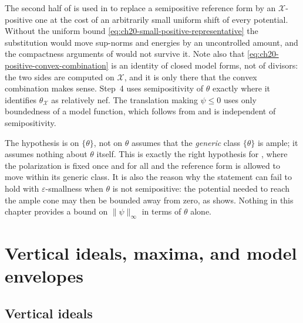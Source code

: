 \begin{remark}
\label{rem:ch20-smallness}
The second half of  is used in
 to replace a semipositive reference
form by an $\mathcal X$-positive one at the cost of an arbitrarily small
uniform shift of every potential.  Without the uniform bound
\eqref{eq:ch20-small-positive-representative} the substitution would move
sup-norms and energies by an uncontrolled amount, and the compactness
arguments of  would not survive it.  Note also
that \eqref{eq:ch20-positive-convex-combination} is an identity of closed
model forms, not of divisors: the two sides are computed on
$\mathcal X$, and it is only there that the convex combination makes
sense.  Step~4 uses semipositivity of $\theta$ exactly where it identifies
$\theta_{\mathcal X}$ as relatively nef.  The translation making
$\psi\leq0$ uses only boundedness of a model function, which follows from
 and is independent of semipositivity.
\end{remark}

\begin{warning}{The hypothesis is on $\{\theta\}$, not on $\theta$}
 assumes that the \emph{generic}
class $\{\theta\}$ is ample; it assumes nothing about $\theta$ itself.
This is exactly the right hypothesis for , where the
polarization is fixed once and for all and the reference form is allowed to
move within its generic class.  It is also the reason why the statement can
fail to hold with $\varepsilon$-smallness when $\theta$ is not
semipositive: the potential needed to reach the ample cone may then be
bounded away from zero, as
 shows.  Nothing in this chapter
provides a bound on $\|\psi\|_\infty$ in terms of $\theta$ alone.
\end{warning}

\section{Vertical ideals, maxima, and model envelopes}
\label{sec:ch20-max-envelopes}

\subsection{Vertical ideals}
\label{sec:ch20-vertical-ideals}

